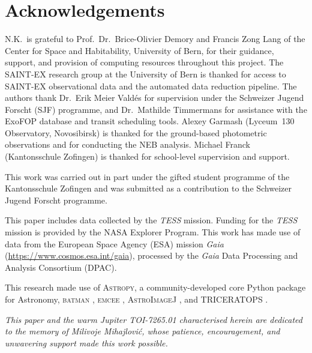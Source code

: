 \documentclass[fleqn,usenatbib]{mnras}
\newcommand{\SAINTEX}{SAINT-EX}
\newcommand{\batman}{\textsc{batman}}
\newcommand{\emcee}{\textsc{emcee}}
\newcommand{\triceratops}{\textsc{TRICERATOPS}}
\newcommand{\AIJ}{\textsc{AstroImageJ}}
\begin{document}
\section*{Acknowledgements}

N.K.\ is grateful to Prof.\ Dr.\ Brice-Olivier Demory and Francis Zong Lang of the Center for Space and Habitability, University of Bern, for their guidance, support, and provision of computing resources throughout this project. The \SAINTEX{} research group at the University of Bern is thanked for access to \SAINTEX{} observational data and the automated data reduction pipeline. The authors thank Dr.\ Erik Meier Valdés for supervision under the Schweizer Jugend Forscht (SJF) programme, and Dr.\ Mathilde Timmermans for assistance with the ExoFOP database and transit scheduling tools. Alexey Garmash (Lyceum~130 Observatory, Novosibirsk) is thanked for the ground-based photometric observations and for conducting the NEB analysis. Michael Franck (Kantonsschule Zofingen) is thanked for school-level supervision and support.

This work was carried out in part under the gifted student programme of the Kantonsschule Zofingen and was submitted as a contribution to the Schweizer Jugend Forscht programme.

This paper includes data collected by the \textit{TESS} mission. Funding for the \textit{TESS} mission is provided by the NASA Explorer Program. This work has made use of data from the European Space Agency (ESA) mission \textit{Gaia} (\url{https://www.cosmos.esa.int/gaia}), processed by the \textit{Gaia} Data Processing and Analysis Consortium (DPAC).

This research made use of \textsc{Astropy}, a community-developed core Python package for Astronomy, \batman{} \citep{kreidberg2015}, \emcee{} \citep{foremanmackey2013}, \AIJ{} \citep{collins2017}, and \triceratops{} \citep{giacalone2021}.

\medskip
\noindent\textit{This paper and the warm Jupiter TOI-7265.01 characterised herein are dedicated to the memory of Milivoje Mihajlovi\'c, whose patience, encouragement, and unwavering support made this work possible.}




\label{lastpage}
\end{document}
